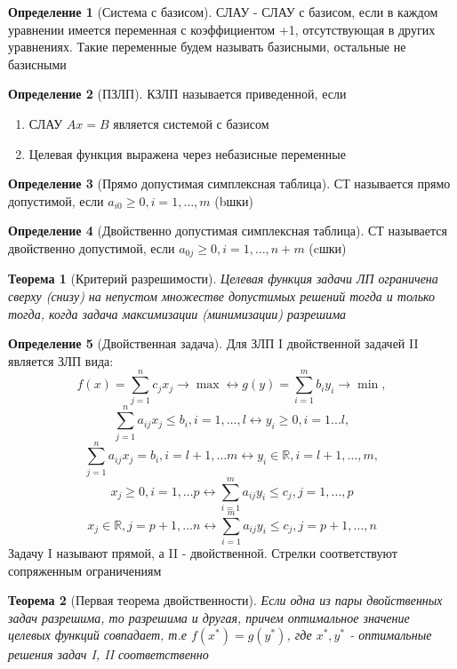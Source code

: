 \documentclass[a4paper]{article}
\newtheorem{theorem}{Теорема}[section]
\theoremstyle{definition}
\newtheorem*{definition}{Определение}
\theoremstyle{remark}
\begin{document}
\begin{definition}[Система с базисом]
	СЛАУ - СЛАУ с базисом, если в каждом уравнении имеется переменная с коэффициентом +1, отсутствующая в других уравнениях. Такие переменные будем называть базисными, остальные не базисными
\end{definition}
\begin{definition}[ПЗЛП]
	КЗЛП называется приведенной, если
	\begin{enumerate}
		\item СЛАУ $Ax = B$ является системой с базисом
		\item Целевая функция выражена через небазисные переменные
	\end{enumerate}
\end{definition}
\begin{definition}[Прямо допустимая симплексная таблица]
	СТ называется прямо допустимой, если $a_{i0}\geq 0, i = 1, \dots, m$ (bшки)
\end{definition}
\begin{definition}[Двойственно допустимая симплексная таблица]
	СТ называется двойственно допустимой, если $a_{0j}\geq 0, i = 1, \dots, n+m$ (cшки)
\end{definition}
\begin{theorem}[Критерий разрешимости]
    Целевая функция задачи ЛП ограничена сверху (снизу) на непустом множестве допустимых решений тогда и только тогда, когда задача максимизации (минимизации) разрешима
\end{theorem}
\begin{definition}[Двойственная задача]
    Для ЗЛП I двойственной задачей II является ЗЛП вида:
        $$f(x) = \sum_{j = 1}^n c_j x_j \to \max \leftrightarrow g(y) = \sum_{i = 1}^m b_i y_i\to \min,$$
        $$\sum_{j = 1}^n a_{ij} x_j \leq b_i, i = 1, \dots, l \leftrightarrow y_i\geq 0, i = 1...l,$$
        $$\sum_{j = 1}^n a_{ij} x_j = b_i, i = l+1, \dots m \leftrightarrow y_i\in \mathbb{R}, i = l+1, \dots, m,$$
        $$x_j\geq 0, i = 1, \dots p\leftrightarrow \sum_{i = 1}^m a_{ij} y_i \leq c_j, j = 1, \dots, p$$
        $$x_j \in \mathbb{R}, j = p+1, \dots n \leftrightarrow \sum_{i = 1}^m a_{ij} y_i \leq c_j, j = p+1, \dots, n$$
        Задачу I называют прямой, а II - двойственной. Стрелки соответствуют сопряженным ограничениям
\end{definition}
\begin{theorem}[Первая теорема двойственности]
    Если одна из пары двойственных задач разрешима, то разрешима и другая, причем оптимальное значение целевых функций совпадает, т.е $f(x^*) = g(y^*)$, где $x^*, y^*$ - оптимальные решения задач I, II соответственно
\end{theorem}
\end{document}
